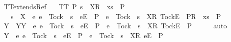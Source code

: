 %
\endisadelimproof
\isanewline
{}\isamarkupfalse%
\ TT{}{\isacharunderscore}extends{\isacharunderscore}Ref{\isacharcolon}\isanewline
\ \ \ {\isachardoublequoteopen}TT{}\ P{\isachardoublequoteclose}\ {\isachardoublequoteopen}s\ {\isacharat}\ {\isacharbrackleft}{\isacharbrackleft}X{\isacharbrackright}\isactrlsub R{\isacharbrackright}\ {\isacharat}\ xs\ {\isasymin}\ P{\isachardoublequoteclose}\isanewline
\ \ \ {\isachardoublequoteopen}s\ {\isacharat}\ {\isacharbrackleft}{\isacharbrackleft}X\ {\isasymunion}\ {\isacharbraceleft}e{\isachardot}\ e\ {\isasymnoteq}\ Tock\ {\isasymand}\ s\ {\isacharat}\ {\isacharbrackleft}{\isacharbrackleft}e{\isacharbrackright}\isactrlsub E{\isacharbrackright}\ {\isasymnotin}\ P\ {\isasymor}\ e\ {\isacharequal}\ Tock\ {\isasymand}\ s\ {\isacharat}\ {\isacharbrackleft}{\isacharbrackleft}X{\isacharbrackright}\isactrlsub R{\isacharcomma}\ {\isacharbrackleft}Tock{\isacharbrackright}\isactrlsub E{\isacharbrackright}\ {\isasymnotin}\ P{\isacharbraceright}{\isacharbrackright}\isactrlsub R{\isacharbrackright}\ {\isacharat}\ xs\ {\isasymin}\ P{\isachardoublequoteclose}\isanewline
%
\isadelimproof
%
\endisadelimproof
%
\isatagproof
{}\isamarkupfalse%
\ {\isacharminus}\isanewline
\ \ \isamarkupfalse%
\ Y\ \ Y{\isacharcolon}{\isachardoublequoteopen}Y\ {\isacharequal}\ {\isacharbraceleft}e{\isachardot}\ e\ {\isasymnoteq}\ Tock\ {\isasymand}\ s\ {\isacharat}\ {\isacharbrackleft}{\isacharbrackleft}e{\isacharbrackright}\isactrlsub E{\isacharbrackright}\ {\isasymnotin}\ P\ {\isasymor}\ e\ {\isacharequal}\ Tock\ {\isasymand}\ s\ {\isacharat}\ {\isacharbrackleft}{\isacharbrackleft}X{\isacharbrackright}\isactrlsub R{\isacharcomma}\ {\isacharbrackleft}Tock{\isacharbrackright}\isactrlsub E{\isacharbrackright}\ {\isasymnotin}\ P{\isacharbraceright}{\isachardoublequoteclose}\isanewline
\ \ \ \ \isamarkupfalse%
\ auto\isanewline
\ \ \isamarkupfalse%
\ \isamarkupfalse%
\ {\isachardoublequoteopen}Y\ {\isasyminter}\ {\isacharbraceleft}e{\isachardot}\ {\isacharparenleft}e\ {\isasymnoteq}\ Tock\ {\isasymand}\ s\ {\isacharat}\ {\isacharbrackleft}{\isacharbrackleft}e{\isacharbrackright}\isactrlsub E{\isacharbrackright}\ {\isasymin}\ P{\isacharparenright}\ {\isasymor}\ {\isacharparenleft}e\ {\isacharequal}\ Tock\ {\isasymand}\ s\ {\isacharat}\ {\isacharbrackleft}{\isacharbrackleft}X{\isacharbrackright}\isactrlsub R{\isacharcomma}\ {\isacharbrackleft}e{\isacharbrackright}\isactrlsub E{\isacharbrackright}\ {\isasymin}\ P{\isacharparenright}\ {\isacharbraceright}\ {\isacharequal}\ {\isacharbraceleft}{\isacharbraceright}{\isachardoublequoteclose}\isanewline
